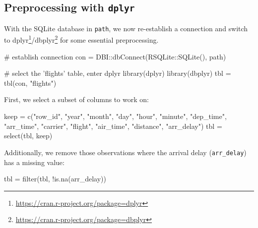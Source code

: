 \documentclass[12pt,]{scrbook}
\newenvironment{Shaded}{}{}
\newcommand{\CommentTok}[1]{\textcolor[rgb]{0.00,0.50,0.00}{#1}}
\newcommand{\KeywordTok}[1]{\textcolor[rgb]{0.00,0.00,1.00}{#1}}
\newcommand{\NormalTok}[1]{#1}
\newcommand{\OperatorTok}[1]{#1}
\newcommand{\StringTok}[1]{\textcolor[rgb]{0.00,0.50,0.50}{#1}}
\renewcommand{\href}[2]{#2\footnote{\url{#1}}}
\begin{document}
\hypertarget{preprocessing-with-dplyr}{%
\subsection{\texorpdfstring{Preprocessing with \texttt{dplyr}}{Preprocessing with dplyr}}\label{preprocessing-with-dplyr}}

With the SQLite database in \texttt{path}, we now re-establish a connection and switch to \href{https://cran.r-project.org/package=dplyr}{dplyr}/\href{https://cran.r-project.org/package=dbplyr}{dbplyr} for some essential preprocessing.

\begin{Shaded}
\begin{Highlighting}[]
\CommentTok{# establish connection}
\NormalTok{con =}\StringTok{ }\NormalTok{DBI}\OperatorTok{::}\KeywordTok{dbConnect}\NormalTok{(RSQLite}\OperatorTok{::}\KeywordTok{SQLite}\NormalTok{(), path)}

\CommentTok{# select the 'flights' table, enter dplyr}
\KeywordTok{library}\NormalTok{(dplyr)}
\KeywordTok{library}\NormalTok{(dbplyr)}
\NormalTok{tbl =}\StringTok{ }\KeywordTok{tbl}\NormalTok{(con, }\StringTok{"flights"}\NormalTok{)}
\end{Highlighting}
\end{Shaded}

First, we select a subset of columns to work on:

\begin{Shaded}
\begin{Highlighting}[]
\NormalTok{keep =}\StringTok{ }\KeywordTok{c}\NormalTok{(}\StringTok{"row_id"}\NormalTok{, }\StringTok{"year"}\NormalTok{, }\StringTok{"month"}\NormalTok{, }\StringTok{"day"}\NormalTok{, }\StringTok{"hour"}\NormalTok{, }\StringTok{"minute"}\NormalTok{, }
  \StringTok{"dep_time"}\NormalTok{, }\StringTok{"arr_time"}\NormalTok{, }\StringTok{"carrier"}\NormalTok{, }\StringTok{"flight"}\NormalTok{, }\StringTok{"air_time"}\NormalTok{, }
  \StringTok{"distance"}\NormalTok{, }\StringTok{"arr_delay"}\NormalTok{)}
\NormalTok{tbl =}\StringTok{ }\KeywordTok{select}\NormalTok{(tbl, keep)}
\end{Highlighting}
\end{Shaded}

Additionally, we remove those observations where the arrival delay (\texttt{arr\_delay}) has a missing value:

\begin{Shaded}
\begin{Highlighting}[]
\NormalTok{tbl =}\StringTok{ }\KeywordTok{filter}\NormalTok{(tbl, }\OperatorTok{!}\KeywordTok{is.na}\NormalTok{(arr_delay))}
\end{Highlighting}
\end{Shaded}
\end{document}
